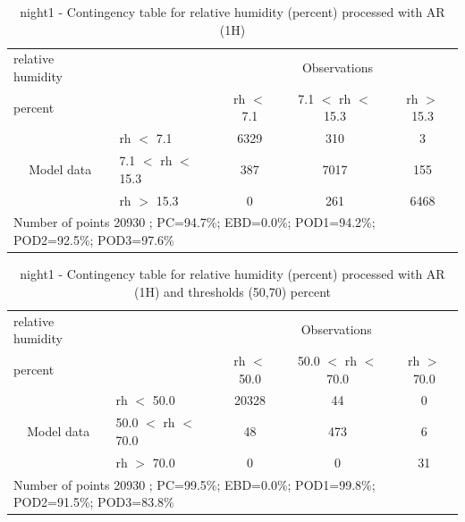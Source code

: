 \begin{table}[p!]
\begin{center}
\begin{tabular}{llccc}
\hline
{relative humidity}                                       &                                                    & \multicolumn{3}{c}{Observations}                 \\
{percent}                                       &                             & rh $<$ 7.1   & 7.1 $<$ rh $<$ 15.3 & rh $>$ 15.3 \\
\hline
\multicolumn{1}{c}{\multirow{3}{*}{Model data}}  & rh $<$ 7.1             & 6329                & 310                       & 3              \\
                                                 & 7.1  $<$ rh $<$ 15.3 & 387                & 7017                       & 155              \\
                                                 & rh $>$ 15.3             & 0                & 261                       & 6468              \\
\hline
\multicolumn{5}{l}{ Number of points        20930 ; PC=94.7\%; EBD=0.0\%; POD1=94.2\%; POD2=92.5\%; POD3=97.6\%}
\end{tabular}
\end{center}
\caption{night1 - Contingency table for  relative humidity (percent) processed with AR (1H)}
\label{tab:contingencyrhAFT:night1}
\end{table}
\begin{table}[p!]
\begin{center}
\begin{tabular}{llccc}
\hline
{relative humidity}                                       &                                                    & \multicolumn{3}{c}{Observations}                 \\
{percent}                                       &                             & rh $<$ 50.0   & 50.0 $<$ rh $<$ 70.0 & rh $>$ 70.0 \\
\hline
\multicolumn{1}{c}{\multirow{3}{*}{Model data}}  & rh $<$ 50.0             & 20328                & 44                       & 0              \\
                                                 & 50.0  $<$ rh $<$ 70.0 & 48                & 473                       & 6              \\
                                                 & rh $>$ 70.0             & 0                & 0                       & 31              \\
\hline
\multicolumn{5}{l}{ Number of points        20930 ; PC=99.5\%; EBD=0.0\%; POD1=99.8\%; POD2=91.5\%; POD3=83.8\%}
\end{tabular}
\end{center}
\caption{night1 - Contingency table for  relative humidity (percent) processed with AR (1H) and thresholds (50,70) percent}
\label{tab:contingencyrhAFT:night1}
\end{table}
